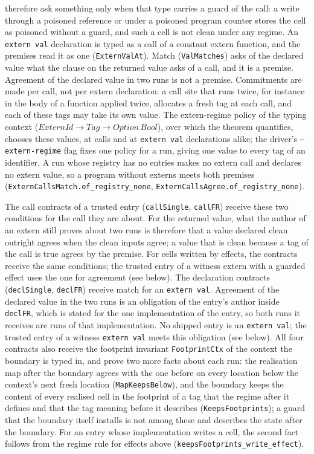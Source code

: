\documentclass[12pt]{article}
\begin{document}
therefore ask something only when that type carries a guard of the call: a
write through a poisoned reference or under a poisoned program counter stores
the cell as poisoned without a guard, and such a cell is not clean under any
regime.
An \texttt{extern val} declaration is typed as a call of a constant extern
function, and the premises read it as one (\texttt{ExternValAt}).  Match
(\texttt{ValMatches}) asks of the declared value what the clause on the
returned value asks of a call, and it is a premise.  Agreement of the declared
value in two runs is not a premise.
Commitments are made per call, not per extern declaration: a call site that
runs twice, for instance in the body of a function applied twice, allocates a
fresh tag at each call, and each of these tags may take its own value.  The
extern-regime policy of the typing context (\(\mathit{ExternId} \to \mathit{Tag}
\to \mathit{Option}\,\mathit{Bool}\)), over which the theorem quantifies,
chooses these values, at calls and at \texttt{extern val} declarations alike;
the driver's \texttt{--extern-regime} flag fixes one policy for a run, giving
one value to every tag of an identifier.
A run whose registry has no entries makes no extern call and declares no
extern value, so a program without externs meets both premises (\texttt{ExternCallsMatch.of\_registry\_none},
\texttt{ExternCallsAgree.of\_registry\_none}).

The call contracts of a trusted entry (\texttt{callSingle}, \texttt{callFR})
receive these two conditions for the call they are about.  For the returned
value, what the author of an extern still proves about two runs is therefore
that a value declared clean outright agrees when the clean inputs agree; a value
that is clean because a tag of the call is true agrees by the premise.  For
cells written by effects, the contracts receive the same conditions; the
trusted entry of a witness extern with a guarded effect uses the one for
agreement (see below).  The
declaration contracts (\texttt{declSingle}, \texttt{declFR}) receive match
for an \texttt{extern val}.  Agreement of the declared value in the two runs is
an obligation of the entry's author inside \texttt{declFR}, which is stated
for the one implementation of the entry, so both runs it receives are runs of
that implementation.  No shipped entry is an \texttt{extern val}; the trusted
entry of a witness \texttt{extern val} meets this obligation (see below).  All four
contracts also receive the footprint invariant \texttt{FootprintCtx} of the
context the boundary is typed in, and prove two more facts about each run: the
realisation map after the boundary agrees with the one before on every
location below the context's next fresh location (\texttt{MapKeepsBelow}), and
the boundary keeps the content of every realised cell in the footprint of a
tag that the regime after it defines and that the tag meaning before it
describes (\texttt{KeepsFootprints}); a guard that the boundary itself
installs is not among these and describes the state after the boundary.  For an
entry whose implementation writes a cell, the second fact follows from the
regime rule for effects above (\texttt{keepsFootprints\_write\_effect}).
\end{document}
